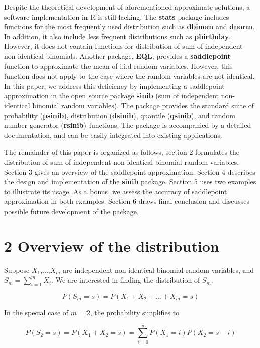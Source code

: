 Despite the theoretical development of aforementioned approximate solutions, a software implementation in R is still lacking. The \textbf{stats} package includes functions for the most frequently used distribution such as \textbf{dbinom} and \textbf{dnorm}. In addition, it also include less frequent distributions such as \textbf{pbirthday}. However, it does not contain functions for distribution of sum of independent non-identical binomials. Another package, \textbf{EQL}, provides a \textbf{saddlepoint} function to approximate the mean of i.i.d random variables. However, this function does not apply to the case where the random variables are not identical. In this paper, we address this deficiency by implementing a saddlepoint approximation in the open source package \textbf{sinib} (sum of independent non-identical binomial random variables). The package provides the standard suite of probability (\textbf{psinib}), distribution (\textbf{dsinib}), quantile (\textbf{qsinib}), and random number generator (\textbf{rsinib}) functions. The package is accompanied by a detailed documentation, and can be easily integrated into existing applications.

The remainder of this paper is organized as follows, section 2 formulates the distribution of sum of independent non-identical binomial random variables. Section 3 gives an overview of the saddlepoint approximation. Section 4 describes the design and implementation of the \textbf{sinib} package. Section 5 uses two examples to illustrate its usage. As a bonus, we assess the accuracy of saddlepoint approximation in both examples. Section 6 draws final conclusion and discusses possible future development of the package. 

\section{2 Overview of the distribution}


Suppose $X_1$,...,$X_m$ are independent non-identical binomial random variables, and $S_m = \sum_{i=1}^{m} X_i$. We are interested in finding the distribution of $S_m$. 

\begin{equation}
P(S_m = s) = P(X_1+X_2+...+X_m = s)
\end{equation}

In the special case of $m = 2$, the probability simplifies to 

\begin{equation}
P(S_2=s) = P(X_1+X_2=s) = \sum_{i=0}^s P(X_1=i) P(X_2=s-i)
\label{eq:2}
\end{equation}

